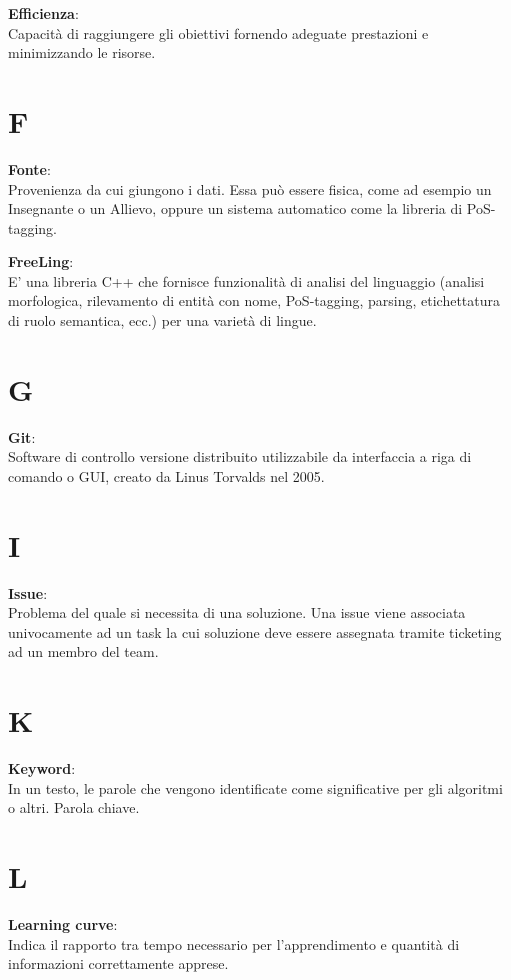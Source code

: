 \documentclass[a4paper, oneside, openany, dvipsnames, table]{article}
\begin{document}
\textbf{Efficienza}:\\	Capacità di raggiungere gli obiettivi fornendo adeguate prestazioni e minimizzando le risorse.


\newpage
\section{F}
\textbf{Fonte}:\\	Provenienza da cui giungono i dati. Essa può essere fisica, come ad esempio un Insegnante o un Allievo, oppure un sistema automatico come la libreria di PoS-tagging.

\textbf{FreeLing}:\\	E' una libreria C++ che fornisce funzionalità di analisi del linguaggio (analisi morfologica, rilevamento di entità con nome, PoS-tagging, parsing, etichettatura di ruolo semantica, ecc.) per una varietà di lingue.


\newpage
\section{G}
\textbf{Git}:\\	 Software di controllo versione distribuito utilizzabile da interfaccia a riga di comando o GUI, creato da Linus Torvalds nel 2005.


\newpage
\section{I}
\textbf{Issue}:\\	Problema del quale si necessita di una soluzione. Una issue viene associata univocamente ad un task la cui soluzione deve essere assegnata tramite ticketing ad un membro del team.


\newpage
\section{K}
\textbf{Keyword}:\\	In un testo, le parole che vengono identificate come significative per gli algoritmi o altri. Parola chiave.


\newpage
\section{L}
\textbf{Learning curve}:\\ Indica il rapporto tra tempo necessario per l'apprendimento e quantità di informazioni correttamente apprese.
\end{document}
